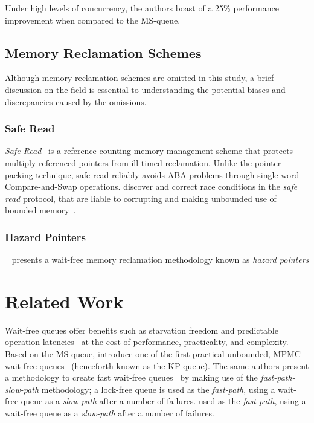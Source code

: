 Under high levels of concurrency, the authors boast of a 25\% performance
improvement when compared to the MS-queue.

\subsection{Memory Reclamation Schemes}
Although memory reclamation schemes are omitted in this study, a brief discussion
on the field is essential to understanding the potential biases and discrepancies caused
by the omissions.

\subsubsection{Safe Read}
\emph{Safe Read}~\citep{valois1994queues,valois1995datastructures} 
is a reference counting memory management scheme that protects multiply referenced
pointers from ill-timed reclamation. 
Unlike the pointer packing technique, safe read reliably avoids ABA problems through
single-word Compare-and-Swap operations. \citeauthor{michael1995correction} discover
and correct race conditions in the \emph{safe read} protocol, that are liable to
corrupting and making unbounded use of bounded memory~\citep{michael1995correction}.

\subsubsection{Hazard Pointers}
\citeauthor{michael2004hazard}~\citep{michael2004hazard} presents a wait-free
memory reclamation methodology known as \emph{hazard pointers}

\section{Related Work}
Wait-free queues offer benefits such as starvation freedom and predictable
operation latencies \textemdash~at the cost of performance, practicality, and complexity.
Based on the MS-queue, \citeauthor{kogan2011wait} introduce one of the first practical unbounded, MPMC
wait-free queues~\citep{kogan2011wait} (henceforth known as the KP-queue). The
same authors present a methodology to create fast wait-free queues~\citep{kogan2012methodology} by
making use of the \emph{fast-path-slow-path} methodology; a lock-free queue is
used as the \emph{fast-path}, using a wait-free queue as a \emph{slow-path} after a number of failures.
used as the \emph{fast-path}, using a wait-free queue as a \emph{slow-path} after a number of failures.

